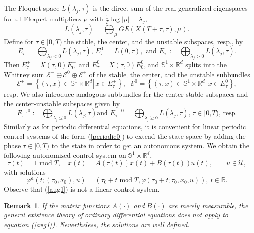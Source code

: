 \documentclass{siamltex}%
\newtheorem{remark}[theorem]{Remark}
\begin{document}
The Floquet space $L(\lambda_{j},\tau)$ is the direct sum of the real
generalized eigenspaces for all Floquet multipliers $\mu$ with $\frac{1}%
{T}\log\left\vert \mu\right\vert =\lambda_{j}$,%
\[
L(\lambda_{j},\tau)=\bigoplus\nolimits_{\mu}GE(X(T+\tau,\tau),\mu).
\]
Define for $\tau\in\lbrack0,T)$ the stable, the center, and the unstable
subspaces, resp., by%
\[
E_{\tau}^{-}=\bigoplus\nolimits_{\lambda_{j}<0}L(\lambda_{j},\tau),\,E_{\tau
}^{0}:=L(0,\tau),\text{ and }E_{\tau}^{+}:=\bigoplus\nolimits_{\lambda_{j}%
>0}L(\lambda_{j},\tau).
\]
Then $E_{\tau}^{\pm}=X(\tau,0)E_{0}^{\pm}$ and $E_{\tau}^{0}=X(\tau
,0)E_{0}^{0}$, and $\mathbb{S}^{1}\times\mathbb{R}^{d}$ splits into the
Whitney sum $\mathcal{E}^{-}\oplus\mathcal{E}^{0}\oplus\mathcal{E}^{+}$ of the
stable, the center, and the unstable subbundles%
\begin{equation}
\mathcal{E}^{\pm}=\left\{  (\tau,x)\in\mathbb{S}^{1}\times\mathbb{R}%
^{d}\left\vert \,x\in E_{\tau}^{\pm}\right.  \right\}  ,\text{ }%
\mathcal{E}^{0}=\left\{  (\tau,x)\in\mathbb{S}^{1}\times\mathbb{R}%
^{d}\left\vert \,x\in E_{\tau}^{0}\right.  \right\}  , \label{bundle1}%
\end{equation}
resp. We also introduce analogous subbundles for the center-stable subspaces
and the center-unstable subspaces given by%
\[
E_{\tau}^{-,0}:=\bigoplus\nolimits_{\lambda_{j}\leq0}L(\lambda_{j},\tau)\text{
and }E_{\tau}^{+,0}=\bigoplus\nolimits_{\lambda_{j}\geq0}L(\lambda_{j}%
,\tau),\,\tau\in\lbrack0,T)\text{, resp.}%
\]
Similarly as for periodic differential equations, it is convenient for linear
periodic control systems of the form (\ref{periodic0}) to extend the state
space by adding the phase $\tau\in\lbrack0,T)$ to the state in order to get an
autonomous system. We obtain the following autonomized control system on
$\mathbb{S}^{1}\times\mathbb{R}^{d}$,%
\begin{equation}
\dot{\tau}(t)=1\operatorname{mod}T,\quad\dot{x}(t)=A(\tau(t))x(t)+B(\tau
(t))u(t),\qquad u\in\mathcal{U}, \label{aug1}%
\end{equation}
with solutions%
\[
\varphi^{a}(t;(\tau_{0},x_{0}),u)=\left(  \tau_{0}+t\operatorname{mod}%
T,\varphi(\tau_{0}+t;\tau_{0},x_{0},u)\right)  ,\ t\in\mathbb{R}.
\]
Observe that (\ref{aug1}) is not a linear control system.

\begin{remark}
If the matrix functions $A(\cdot)$ and $B(\cdot)$ are merely measurable, the
general existence theory of ordinary differential equations does not apply to
equation (\ref{aug1}). Nevertheless, the solutions are well defined.
\end{remark}
\end{document}
